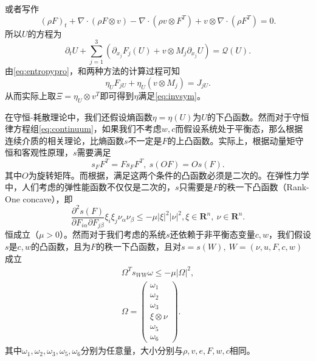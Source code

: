 \documentclass{article}
\begin{document}
或者写作
\begin{equation*}
(\rho F)_t + \nabla \cdot (\rho F \otimes v) - \nabla \cdot (\rho v \otimes F^T) + v \otimes \nabla \cdot (\rho F^T) = 0 .
\end{equation*}
所以$U$的方程为
\begin{equation*}
	\partial_t U + \sum_{j=1}^3 (\partial_{x_j} F_j(U) + v\otimes M_j \partial_{x_j} U)= \mathcal{Q} (U) .
\end{equation*}
由\eqref{eq:entropypro}，和两种方法的计算过程可知
\begin{equation*}
	\eta_U F_{jU} + \eta_{U} (v \otimes M_{j}) = J_{jU}.
\end{equation*}
从而实际上取$\Xi = \eta_U \otimes v^T$即可得到$\eta$满足\eqref{eq:invsym}。

在守恒-耗散理论中，我们还假设熵函数$\eta=\eta(U)$为$U$的下凸函数。然而对于守恒律方程组\eqref{eq:continuum}，如果我们不考虑$w,c$而假设系统处于平衡态，那么根据连续介质的相关理论\cite{}，比熵函数$s$不一定是$F$的上凸函数。实际上，根据动量矩守恒和客观性原理，$s$需要满足
\begin{equation}
	s_F F^T = F s_F F^T, \ s(OF) = O s(F).
\end{equation}
其中$O$为旋转矩阵\cite{}。而根据\cite{}，满足这两个条件的凸函数必须是二次的。在弹性力学中，人们考虑的弹性能函数不仅仅是二次的，$s$只需要是$F$的秩一下凸函数（Rank-One concave），即
\begin{equation*}
	\frac{\partial^2 s(F)}{\partial F_{i\alpha} \partial F_{j\beta}} \xi_i \xi_j \nu_\alpha \nu_\beta \le -\mu |\xi|^2 |\nu|^2, \xi \in \mathbf{R}^n, \ \nu \in \mathbf{R}^n. 
\end{equation*}
恒成立（$\mu>0$）。然而对于我们考虑的系统$s$还依赖于非平衡态变量$c,w$，我们假设$s$是$c,w$的凸函数，且为$F$的秩一下凸函数，且对$s=s(W),\ W= (\nu,u,F,c,w)$成立
\begin{eqnarray}
	\Omega^T s_{WW} \omega \le -\mu |\Omega|^2, \label{eq:FCDFconvex}\\ 
	\Omega = \left( \begin{array}{c}
		\omega_1 \\ \omega_2 \\ \omega_3 \\ \xi \otimes \nu \\ \omega_5 \\ \omega_6
	\end{array}\right). \nonumber
\end{eqnarray}
其中$\omega_1,\omega_2,\omega_3,\omega_5,\omega_6$分别为任意量，大小分别与$\rho, v,e, F,w,c$相同。
\end{document}
